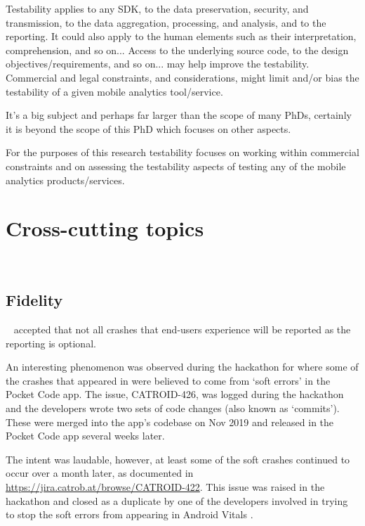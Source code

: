 Testability applies to any SDK, to the data preservation, security, and transmission, to the data aggregation, processing, and analysis, and to the reporting. It could also apply to the human elements such as their interpretation, comprehension, and so on... Access to the underlying source code, to the design objectives/requirements, and so on... may help improve the testability. Commercial and legal constraints, and considerations, might limit and/or bias the testability of a given mobile analytics tool/service.

It's a big subject and perhaps far larger than the scope of many PhDs, certainly it is beyond the scope of this PhD which focuses on other aspects. 

For the purposes of this research testability focuses on working within commercial constraints and on assessing the testability aspects of testing any of the mobile analytics products/services.

\section{Cross-cutting topics}~\label{tata-cross-cutting-concerns}

\subsection{Fidelity}~\label{tata-fidelity-topic}
 accepted that not all crashes that end-users experience will be reported as the reporting is optional. 

An interesting phenomenon was observed during the  hackathon for  where some of the crashes that appeared in  were believed to come from `soft errors' in the Pocket Code app. The issue, CATROID-426, was logged during the hackathon~ and the developers wrote two sets of code changes (also known as `commits'). These were merged into the app's codebase on  Nov 2019 and released in the Pocket Code app several weeks later.

The intent was laudable, however, at least some of the soft crashes continued to occur over a month later, as documented in \url{https://jira.catrob.at/browse/CATROID-422}. This issue was raised in the hackathon and closed as a duplicate by one of the developers involved in trying to stop the soft errors from appearing in Android Vitals .

